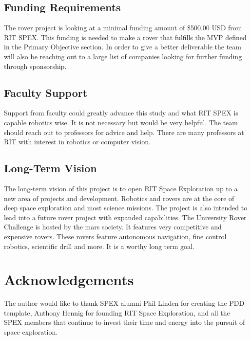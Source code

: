 \documentclass[conference]{IEEEtran} %
\begin{document}
\subsection{Funding Requirements}

The rover project is looking at a minimal funding amount of \$500.00 USD from RIT SPEX. This funding is needed to make a rover that fulfills the MVP defined in the Primary Objective section. In order to give a better deliverable the team will also be reaching out to a large list of companies looking for further funding through sponsorship. 

\subsection{Faculty Support}
Support from faculty could greatly advance this study and what RIT SPEX is capable robotics wise. It is not necessary but would be very helpful. The team should reach out to professors for advice and help. There are many professors at RIT with interest in robotics or computer vision.

\subsection{Long-Term Vision}
\label{sec:vision}
The long-term vision of this project is to open RIT Space Exploration up to a new area of projects and development. 
Robotics and rovers are at the core of deep space exploration and most science missions. 
The project is also intended to lead into a future rover project with expanded capabilities.
The University Rover Challenge is hosted by the mars society. 
It features very competitive and expensive rovers. 
These rovers feature autonomous navigation, fine control robotics, scientific drill and more. 
It is a worthy long term goal. 


\section*{Acknowledgements}
The author would like to thank SPEX alumni Phil Linden for creating the PDD template, Anthony Hennig for founding RIT Space Exploration, and all the SPEX members that continue to invest their time and energy into the pursuit of space exploration.




\onecolumn
\appendices{}
\end{document}

